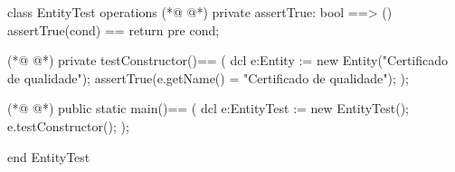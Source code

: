\begin{vdmpp}[breaklines=true]
class EntityTest
 operations
(*@
\label{assertTrue:3}
@*)
  private assertTrue: bool ==> ()
    assertTrue(cond) == return
    pre cond;
    
(*@
\label{testConstructor:7}
@*)
  private testConstructor()==
  (
   dcl e:Entity := new Entity("Certificado de qualidade");
   assertTrue(e.getName() = "Certificado de qualidade");
  );
  
(*@
\label{main:13}
@*)
  public static main()==
    (
   dcl e:EntityTest := new EntityTest();
   e.testConstructor();
    );
     
end EntityTest
\end{vdmpp}
